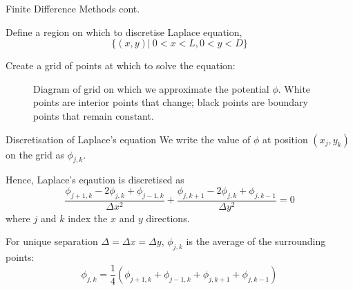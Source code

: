 \documentclass{beamer}
\newcommand{\be}{\begin{equation}}
\newcommand{\ee}{\end{equation}}
\begin{document}
\begin{frame}{Finite Difference Methods cont.}

Define a region on which to discretise Laplace equation, 
%
\be
\{(x,y)|\:0<x<L,0<y<D\}
\ee

Create a grid of points at which to solve the equation:

\begin{figure}
\centering
{}
\caption{Diagram of grid on which we approximate the potential $\phi$. White points
are interior points that change; black points are boundary points that remain constant.}
\end{figure}

\end{frame}

\begin{frame}{Discretisation of Laplace's equation}
We write the value of $\phi$ at position $(x_j,y_k)$ on the grid as $\phi_{j,k}$.

Hence, Laplace's eqaution is discretised as
%
\be
\frac{\phi_{j+1,k}-2\phi_{j,k}+\phi_{j-1,k}}{\Delta x^2} + \frac{\phi_{j,k+1}-2\phi_{j,k}+\phi_{j,k-1}}{\Delta y^2}=0
\ee
%
where $j$ and $k$ index the $x$ and $y$ directions.

For unique separation $\Delta = \Delta x = \Delta y$, $\phi_{j,k}$ is the average of the
surrounding points:
%
\be
\phi_{j,k}= \frac{1}{4}(\phi_{j+1,k}+\phi_{j-1,k}+\phi_{j,k+1}+\phi_{j,k-1})
\ee

\end{frame}
\end{document}
